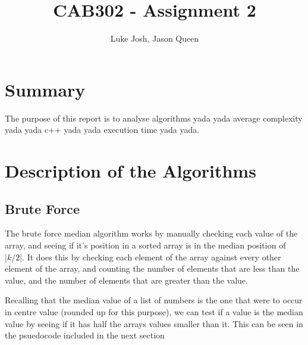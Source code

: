 \documentclass{article}
\title{CAB302 - Assignment 2}
\author{Luke Josh, Jason Queen}
\begin{document}

\maketitle
\tableofcontents

\section{Summary}
    The purpose of this report is to analyse algorithms yada yada average complexity yada yada c++ yada yada execution time yada yada.

\section{Description of the Algorithms}
    \subsection{Brute Force}
        The brute force median algorithm works by manually checking each value of the array, and seeing if it's position in a sorted array is in the median position of $|k / 2|$. It does this by checking each element of the array against every other element of the array, and counting the number of elements that are less than the value, and the number of elements that are greater than the value.

        Recalling that the median value of a list of numbers is the one that were to occur in centre value (rounded up for this purpose), we can test if a value is the median value by seeing if it has half the arrays values smaller than it. This can be seen in the psuedocode included in the next section
\end{document}
